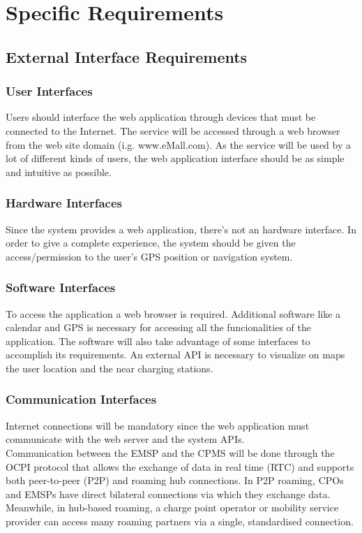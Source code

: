 \documentclass[table, 12pt]{article} %
\begin{document}
    
    
    
    \newpage
    \section{Specific Requirements}
    
    \subsection{External Interface Requirements}

    \subsubsection{User Interfaces}
    Users should interface the web application through devices that must be connected to the Internet. The service will be accessed through a web browser from the web site domain (i.g. www.eMall.com).
    As the service will be used by a lot of different kinds of users, the web application interface should be as simple and intuitive as possible.
    

    \subsubsection{Hardware Interfaces}
    \label{hardware_interfaces}
    Since the system provides a web application, there's not an hardware interface. 
    In order to give a complete experience, the system should be given the access/permission to the user's GPS position or navigation system.  

    \subsubsection{Software Interfaces}
    \label{software_interfaces}
    To access the application a web browser is required. Additional software like a calendar and GPS is necessary for accessing all the funcionalities of the application. The software will also take advantage of some interfaces to accomplish its requirements. An external API is necessary to visualize on maps the user location and the near charging stations. %
    
    \subsubsection{Communication Interfaces}
    Internet connections will be mandatory since the web application must communicate with the web server and the system APIs.\\
    Communication between the EMSP and the CPMS will be done through the OCPI protocol that allows the exchange of data in real time (RTC) and supports both peer-to-peer (P2P) and roaming hub connections. In P2P roaming, CPOs and EMSPs have direct bilateral connections via which they exchange data. Meanwhile, in hub-based roaming, a charge point operator or mobility service provider can access many roaming partners via a single, standardised connection.
    
\end{document}
